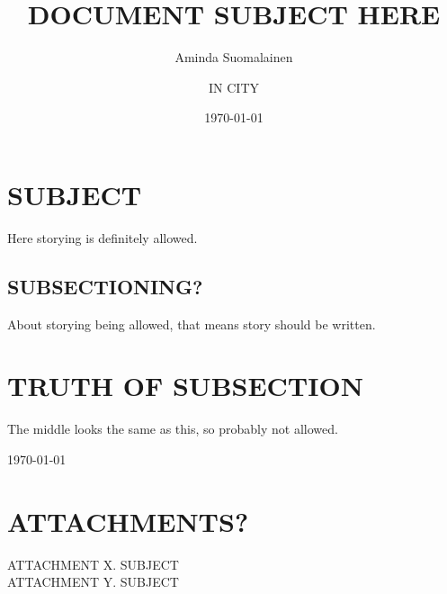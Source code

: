 \documentclass[a4paper]{vakioasiakirja}
\author{Aminda Suomalainen}
\date{\today}
\title{DOCUMENT SUBJECT HERE}
\begin{document}
\maketitle

\section*{SUBJECT}

\align Here storying is definitely allowed.

\subsection*{SUBSECTIONING?}

\align About storying being allowed, that means story should be written.

\section*{TRUTH OF SUBSECTION}


\align The middle looks the same as this, so probably not allowed.

\signature{IN CITY}\today

\vfill

\section{ATTACHMENTS?}
\align
ATTACHMENT X. SUBJECT \\
ATTACHMENT Y. SUBJECT

\end{document}
